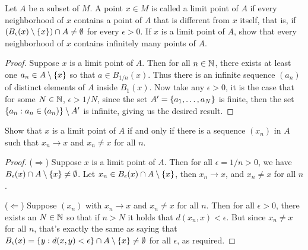 \begin{exercise}{33}
Let $A$ be a subset of $M$. A point $x\in M$ is called a limit point of $A$ if every neighborhood of $x$ contains a point of $A$ that is different from $x$ itself, that is, if $(B_\epsilon(x)\setminus \{x\})\cap A\neq\emptyset$ for every $\epsilon>0$. If $x$ is a limit point of $A$, show that every neighborhood of $x$ contains infinitely many points of $A$.
\end{exercise}
\begin{proof}
Suppose $x$ is a limit point of $A$. 
Then for all $n\in\mathbb{N}$, there exists at least one $a_n\in A\setminus\{x\}$ so that $a\in B_{1/n}(x)$. 
Thus there is an infinite sequence $(a_n)$ of distinct elements of $A$ inside $B_1(x)$. 
Now take any $\epsilon>0$, it is the case that for some $N\in\mathbb{N}$, $\epsilon>1/N$, since the set $A'=\{a_1,\dots,a_N\}$ is finite, then the set $\{a_n: a_n\in (a_n)\}\setminus A'$ is infinite, giving us the desired result.
\end{proof} 

\begin{exercise}{34}
Show that $x$ is a limit point of $A$ if and only if there is a sequence $(x_n)$ in $A$ such that $x_n\to x$ and $x_n\neq x$ for all $n$.
\end{exercise}
\begin{proof}
($\Rightarrow$) Suppose $x$ is a limit point of $A$. 
Then for all $\epsilon=1/n>0$, we have $B_\epsilon(x)\cap A\setminus\{x\}\neq\emptyset$.
Let $x_n\in B_\epsilon(x)\cap A\setminus\{x\}$, then $x_n\to x$, and $x_n\neq x$ for all $n$.

($\Leftarrow$) Suppose $(x_n)$ with $x_n\to x$ and $x_n\neq x$ for all $n$. 
Then for all $\epsilon>0$, there exists an $N\in\mathbb{N}$ so that if $n>N$ it holds that $d(x_n,x)<\epsilon$. 
But since $x_n\neq x$ for all $n$, that's exactly the same as saying that $B_\epsilon(x) =\{y:d(x,y)<\epsilon\}\cap A\setminus\{x\} \neq\emptyset$ for all $\epsilon$, as required.
\end{proof} 


